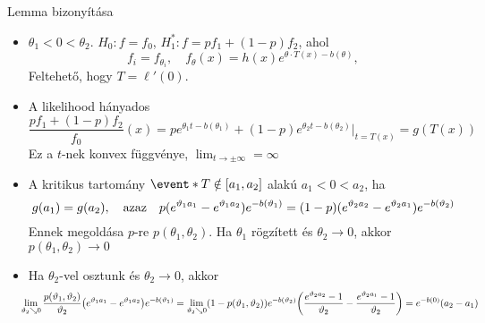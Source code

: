 \documentclass[aspectratio=169,notheorems,9pt,\option]{beamer}
\begin{document}
\begin{frame}{Lemma bizonyítása}
  \begin{itemize}
    \item $\theta_1<0<\theta_2$. $H_0:f=f_0$, $H_1^*:f=pf_1+ (1-p)f_2$, ahol 
    \begin{displaymath}
      f_i  = f_{\theta_i}, \quad f_\theta(x) = h (x)e^{\theta\cdot T(x) - b (\theta)},
    \end{displaymath}
    Feltehető, hogy $T=\ell'(0)$. %
    \item A likelihood hányados 
    \begin{displaymath}
      \frac{pf_1+ (1-p)f_2}{f_0} (x) 
      =p e^{\theta_1 t-b (\theta_1)}+(1-p)e^{\theta_2 t-b (\theta_2)}|_{t=T(x)}=g (T(x))
    \end{displaymath}
    Ez a $t$-nek konvex függvénye, $\lim_{t\to\pm\infty} =\infty$
    \item A kritikus tartomány $\event*{T\notin [a_1,a_2]}$ alakú $a_1<0<a_2$, ha
    \begin{displaymath}
      g (a_1)=g (a_2),\quad\text{azaz}\quad
      p(e^{\vartheta_1 a_1}-e^{\vartheta_1 a_2})e^{-b (\vartheta_1)}
      = (1-p)(e^{\vartheta_2 a_2}-e^{\vartheta_2 a_1})e^{-b (\vartheta_2)}
    \end{displaymath}
    Ennek megoldása $p$-re $p (\theta_1,\theta_2)$. Ha $\theta_1$ rögzített és $\theta_2\to0$, akkor $p(\theta_1,\theta_2)\to0$
    \item Ha $\theta_2$-vel osztunk és $\theta_2\to0$, akkor
    \begin{displaymath}
      \hphantom{\hbox{}\hspace{-1em}}
      \lim_{\theta_2\searrow0}\frac{p (\theta_1,\theta_2)}{\theta_2} 
      \zjel*{e^{\theta_1 a_1}-e^{\theta_1 a_2}}e^{-b(\theta_1)}
      = \lim_{\theta_2\searrow0} (1-p(\theta_1,\theta_2)) 
      e^{-b (\theta_2)} \zjel*{\frac{e^{\theta_2a_2}-1}{\theta_2}-\frac{e^{\theta_2a_1}-1}{\theta_2}}
      = e^{-b(0)}(a_2-a_1)
    \end{displaymath}
  \end{itemize}
\end{frame}
\end{document}
